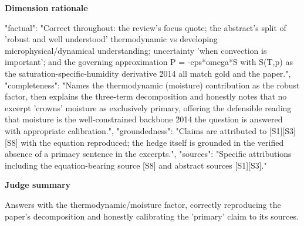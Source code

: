 \documentclass[10pt]{article}
\begin{document}
\textbf{Dimension rationale}
\begin{EvidenceText}
{
  "factual": "Correct throughout: the review's focus quote; the abstract's split of 'robust and well understood' thermodynamic vs developing microphysical/dynamical understanding; uncertainty 'when convection is important'; and the governing approximation P = -eps*omega*S with S(T,p) as the saturation-specific-humidity derivative \u2014 all match gold and the paper.",
  "completeness": "Names the thermodynamic (moisture) contribution as the robust factor, then explains the three-term decomposition and honestly notes that no excerpt 'crowns' moisture as exclusively primary, offering the defensible reading that moisture is the well-constrained backbone \u2014 the question is answered with appropriate calibration.",
  "groundedness": "Claims are attributed to [S1][S3][S8] with the equation reproduced; the hedge itself is grounded in the verified absence of a primacy sentence in the excerpts.",
  "sources": "Specific attributions including the equation-bearing source [S8] and abstract sources [S1][S3]."
}
\end{EvidenceText}

\textbf{Judge summary}
\begin{EvidenceText}
Answers with the thermodynamic/moisture factor, correctly reproducing the paper's decomposition and honestly calibrating the 'primary' claim to its sources.
\end{EvidenceText}
\end{document}
